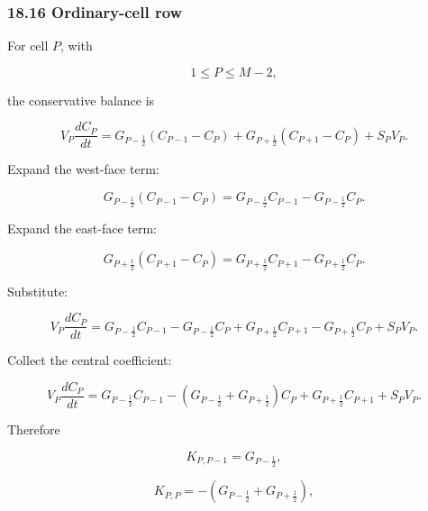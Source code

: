 \documentclass[11pt,a4paper]{article}
\begin{document}
\subsubsection*{18.16 Ordinary-cell row}

For cell $P$, with

\begin{equation}
1\le P\le M-2,
\tag{TRISO-FV-242}
\label{eq:triso-fv-242}
\end{equation}

the conservative balance is

\begin{equation}
V_P\frac{dC_P}{dt}
=
G_{P-\frac12}(C_{P-1}-C_P)
+
G_{P+\frac12}(C_{P+1}-C_P)
+
S_PV_P.
\tag{TRISO-FV-243}
\label{eq:triso-fv-243}
\end{equation}

Expand the west-face term:

\begin{equation}
G_{P-\frac12}(C_{P-1}-C_P)
=
G_{P-\frac12}C_{P-1}
-
G_{P-\frac12}C_P.
\tag{TRISO-FV-244}
\label{eq:triso-fv-244}
\end{equation}

Expand the east-face term:

\begin{equation}
G_{P+\frac12}(C_{P+1}-C_P)
=
G_{P+\frac12}C_{P+1}
-
G_{P+\frac12}C_P.
\tag{TRISO-FV-245}
\label{eq:triso-fv-245}
\end{equation}

Substitute:

\begin{equation}
V_P\frac{dC_P}{dt}
=
G_{P-\frac12}C_{P-1}
-
G_{P-\frac12}C_P
+
G_{P+\frac12}C_{P+1}
-
G_{P+\frac12}C_P
+
S_PV_P.
\tag{TRISO-FV-246}
\label{eq:triso-fv-246}
\end{equation}

Collect the central coefficient:

\begin{equation}
\boxed{
V_P\frac{dC_P}{dt}
=
G_{P-\frac12}C_{P-1}
-
\left(
G_{P-\frac12}+G_{P+\frac12}
\right)C_P
+
G_{P+\frac12}C_{P+1}
+
S_PV_P.
}
\tag{TRISO-FV-247}
\label{eq:triso-fv-247}
\end{equation}

Therefore

\begin{equation}
K_{P,P-1}
=
G_{P-\frac12},
\tag{TRISO-FV-248}
\label{eq:triso-fv-248}
\end{equation}

\begin{equation}
K_{P,P}
=
-\left(
G_{P-\frac12}+G_{P+\frac12}
\right),
\tag{TRISO-FV-249}
\label{eq:triso-fv-249}
\end{equation}
\end{document}
